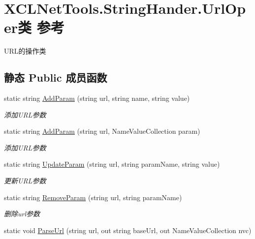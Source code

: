 \hypertarget{class_x_c_l_net_tools_1_1_string_hander_1_1_url_oper}{}\section{X\+C\+L\+Net\+Tools.\+String\+Hander.\+Url\+Oper类 参考}
\label{class_x_c_l_net_tools_1_1_string_hander_1_1_url_oper}


U\+R\+L的操作类  


\subsection*{静态 Public 成员函数}
\begin{DoxyCompactItemize}
\item 
static string \hyperlink{class_x_c_l_net_tools_1_1_string_hander_1_1_url_oper_a63e4554d226a4e22cdf68614d6fdd1c1}{Add\+Param} (string url, string name, string value)
\begin{DoxyCompactList}\small\item\em 添加\+U\+R\+L参数 \end{DoxyCompactList}\item 
static string \hyperlink{class_x_c_l_net_tools_1_1_string_hander_1_1_url_oper_ae4e0043d5ebfc5401f90242992071fdc}{Add\+Param} (string url, Name\+Value\+Collection param)
\begin{DoxyCompactList}\small\item\em 添加\+U\+R\+L参数 \end{DoxyCompactList}\item 
static string \hyperlink{class_x_c_l_net_tools_1_1_string_hander_1_1_url_oper_adda296014d4edff564f69975de4d3171}{Update\+Param} (string url, string param\+Name, string value)
\begin{DoxyCompactList}\small\item\em 更新\+U\+R\+L参数 \end{DoxyCompactList}\item 
static string \hyperlink{class_x_c_l_net_tools_1_1_string_hander_1_1_url_oper_aee0fcf87276a12d12e71d2d905e286e0}{Remove\+Param} (string url, string param\+Name)
\begin{DoxyCompactList}\small\item\em 删除url参数 \end{DoxyCompactList}\item 
static void \hyperlink{class_x_c_l_net_tools_1_1_string_hander_1_1_url_oper_a8786e6cf26b3496627bbcc037ca72ca7}{Parse\+Url} (string url, out string base\+Url, out Name\+Value\+Collection nvc)

\end{DoxyCompactItemize}
